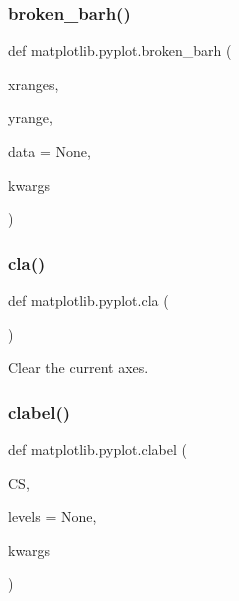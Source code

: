\mbox{\label{namespacematplotlib_1_1pyplot_a320464f6a10552adc04fb182b991ee75}} 
\subsubsection{\texorpdfstring{broken\+\_\+barh()}{broken\_barh()}}
{\footnotesize\ttfamily def matplotlib.\+pyplot.\+broken\+\_\+barh (\begin{DoxyParamCaption}\item[{}]{xranges,  }\item[{}]{yrange,  }\item[{}]{data = {\ttfamily None},  }\item[{}]{kwargs }\end{DoxyParamCaption})}

\mbox{\label{namespacematplotlib_1_1pyplot_ae6abe8750f49b2c2c8f22395cc9c35fc}} 
\subsubsection{\texorpdfstring{cla()}{cla()}}
{\footnotesize\ttfamily def matplotlib.\+pyplot.\+cla (\begin{DoxyParamCaption}{ }\end{DoxyParamCaption})}

\begin{DoxyVerb}Clear the current axes.\end{DoxyVerb}
 \mbox{\label{namespacematplotlib_1_1pyplot_aa25b9f9a34785195c70fee1a330476c2}} 
\subsubsection{\texorpdfstring{clabel()}{clabel()}}
{\footnotesize\ttfamily def matplotlib.\+pyplot.\+clabel (\begin{DoxyParamCaption}\item[{}]{CS,  }\item[{}]{levels = {\ttfamily None},  }\item[{}]{kwargs }\end{DoxyParamCaption})}

